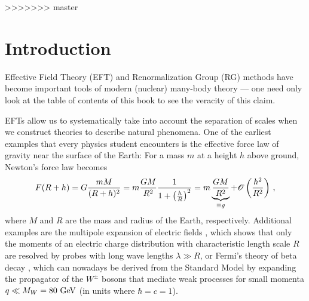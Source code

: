 >>>>>>> master
\maketitle
{}

\section{Introduction}
Effective Field Theory (EFT) and Renormalization Group (RG) methods
have become important tools of modern (nuclear) many-body theory ---
one need only look at the table of contents of this book to see the
veracity of this claim.

EFTs allow us to systematically take into account the separation of
scales when we construct theories to describe natural phenomena. One
of the earliest examples that every physics student encounters is the 
effective force law of gravity near the surface of the Earth: For a
mass $m$ at a height $h$ above ground, Newton's force law becomes
\begin{equation}
  F(R+h) = G\frac{m M}{(R+h)^2} = m \frac{GM}{R^2} \frac{1}{1+\left(\frac{h}{R}\right)^2}
  =m \underbrace{\frac{GM}{R^2}}_{\equiv g} + \mathcal{O}\left(\frac{h^2}{R^2}\right)\,,
\end{equation}
where $M$ and $R$ are the mass and radius of the Earth, respectively.
Additional examples are the multipole expansion of electric fields 
\cite{Jackson:1999yg}, which shows that only the moments of an electric
charge distribution with characteristic length scale $R$ are resolved
by probes with long wave lengths $\lambda\gg R$, or Fermi's theory of 
beta decay \cite{Fermi:1934eu}, which can nowadays be derived from the
Standard Model by expanding the propagator of the $W^\pm$ bosons that
mediate weak processes for small momenta $q\ll M_W=80\,\,\text{GeV}$ (in units
where $\hbar=c=1$).

